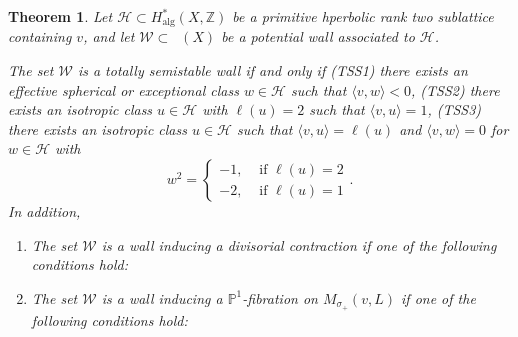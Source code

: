 \documentclass[leqno,11pt]{amsart}
\def\P{\ensuremath{\mathbb{P}}}
\def\Z{\ensuremath{\mathbb{Z}}}
\def\alg{\mathrm{alg}}
\def\Hal{H^*_{\alg}}
\def\rk{\mathop{\mathrm{rk}}}
\def\Stab{\mathop{\mathrm{Stab}}}
\def\Stabd{\mathop{\Stab^{\dagger}}}
\newtheorem{Thm}{Theorem}[section]
\theoremstyle{definition}
\def\P{\ensuremath{\mathbb{P}}}
\def\Z{\ensuremath{\mathbb{Z}}}
\def\HH{\ensuremath{\mathcal H}}
\def\WW{\ensuremath{\mathcal W}}
\begin{document}
\begin{Thm}\label{classification of walls}
Let $\HH\subset \Hal(X,\Z)$ be a primitive hperbolic rank two sublattice containing $v$, and let $\WW\subset\Stabd(X)$ be a potential wall associated to $\HH$.  

The set $\WW$ is a totally semistable wall if and only if (TSS1) there exists an effective spherical or exceptional class $w\in\HH$ such that $\langle v,w\rangle<0$, (TSS2) there exists an isotropic class $u\in\HH$ with $\ell(u)=2$ such that $\langle v,u\rangle=1$, (TSS3) there exists an isotropic class $u\in\HH$ such that $\langle v,u\rangle=\ell(u)$ and $\langle v,w\rangle=0$ for $w\in\HH$ with 
\begin{equation}
w^2=\begin{cases}
-1, &\mbox{ if }\ell(u)=2 \\
-2, &\mbox{ if }\ell(u)=1
\end{cases}.
\end{equation}
In addition,
\begin{enumerate}
\item\label{thm:Classification,Divisorial} The set $\WW$ is a wall inducing a divisorial contraction if one of the following conditions hold:
\item\label{thm:Classification,Fibration} The set $\WW$ is a wall inducing a $\P^1$-fibration on $M_{\sigma_+}(v,L)$ if one of the following conditions hold:
\end{enumerate}
\end{Thm}
\end{document}

